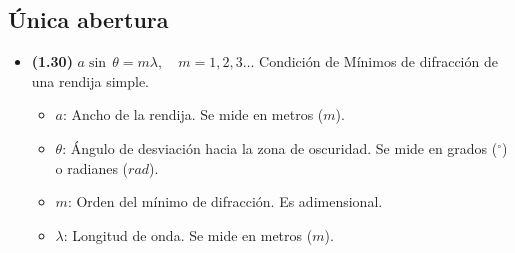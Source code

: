 \documentclass{article}
\begin{document}
		\subsection*{Única abertura}
			\begin{itemize}
				\item \textbf{(1.30)} $\boxed{a\sin\,\theta=m\lambda, \quad m=1,2,3\dots}$ Condición de Mínimos de difracción de una rendija simple.
				\begin{itemize}
					\item $a$: Ancho de la rendija. Se mide en metros ($m$).
					\item $\theta$: Ángulo de desviación hacia la zona de oscuridad. Se mide en grados ($^\circ$) o radianes ($rad$).
					\item $m$: Orden del mínimo de difracción. Es adimensional.
					\item $\lambda$: Longitud de onda. Se mide en metros ($m$).
				\end{itemize}
			\end{itemize}
\end{document}
